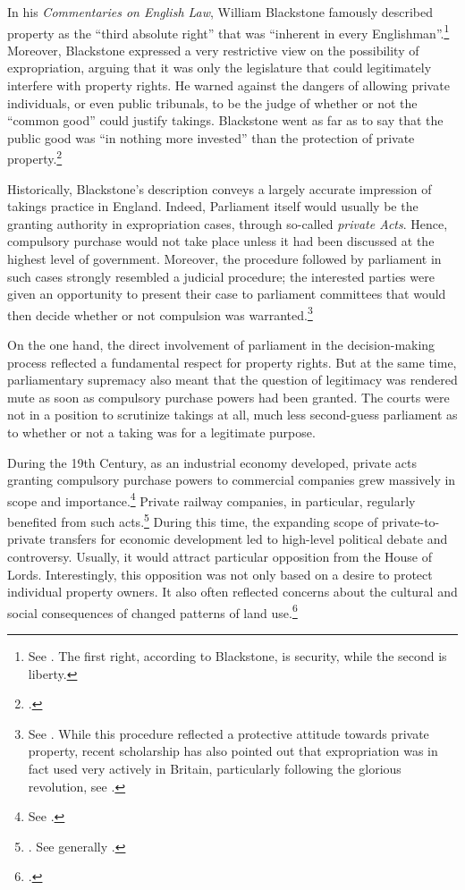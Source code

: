 In his {\it Commentaries on English Law}, William Blackstone famously described property as the ``third absolute right'' that was ``inherent in every Englishman''.\footnote{See \cite[134-135]{blackstone79}. The first right, according to Blackstone, is security, while the second is liberty.}  Moreover, Blackstone expressed a very restrictive view on the possibility of expropriation, arguing that it was only the legislature that could legitimately interfere with property rights. He warned against the dangers of allowing private individuals, or even public tribunals, to be the judge of whether or not the ``common good'' could justify takings. Blackstone went as far as to say that the public good was ``in nothing more invested'' than the protection of private property.\footcite[134-135]{blackstone79}

Historically, Blackstone's description conveys a largely accurate impression of takings practice in England. Indeed, Parliament itself would usually be the granting authority in expropriation cases, through so-called {\it private Acts}. Hence, compulsory purchase would not take place unless it had been discussed at the highest level of government. Moreover, the procedure followed by parliament in such cases strongly resembled a judicial procedure; the interested parties were given an opportunity to present their case to parliament committees that would then decide whether or not compulsion was warranted.\footnote{See \cite[13-16]{allen00}. While this procedure reflected a protective attitude towards private property, recent scholarship has also pointed out that expropriation was in fact used very actively in Britain, particularly following the glorious revolution, see \cite{hoppit11}.}

On the one hand, the direct involvement of parliament in the decision-making process reflected a fundamental respect for property rights. But at the same time, parliamentary supremacy also meant that the question of legitimacy was rendered mute as soon as compulsory purchase powers had been granted. The courts were not in a position to scrutinize takings at all, much less second-guess parliament as to whether or not a taking was for a legitimate purpose.

During the 19th Century, as an industrial economy developed, private acts granting compulsory purchase powers to commercial companies grew massively in scope and importance.\footnote{See \cite[204]{allen00}.} Private railway companies, in particular, regularly benefited from such acts.\footnote{\cite[204]{allen00}. See generally \cite{kostal97}.} During this time, the expanding scope of private-to-private transfers for economic development led to high-level political debate and controversy. Usually, it would attract particular opposition from the House of Lords. Interestingly, this opposition was not only based on a desire to protect individual property owners. It also often reflected concerns about the cultural and social consequences of changed patterns of land use.\footcite[204]{allen00} 

